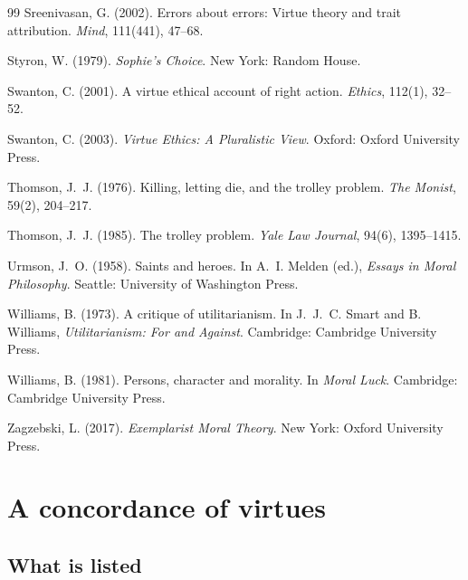 \documentclass{situationist-preprint}
\begin{document}
\begin{thebibliography}{99}
 Sreenivasan, G. (2002). Errors about errors: Virtue theory and trait attribution. \emph{Mind}, 111(441), 47--68.

 Styron, W. (1979). \emph{Sophie's Choice}. New York: Random House.

 Swanton, C. (2001). A virtue ethical account of right action. \emph{Ethics}, 112(1), 32--52.

 Swanton, C. (2003). \emph{Virtue Ethics: A Pluralistic View}. Oxford: Oxford University Press.

 Thomson, J.~J. (1976). Killing, letting die, and the trolley problem. \emph{The Monist}, 59(2), 204--217.

 Thomson, J.~J. (1985). The trolley problem. \emph{Yale Law Journal}, 94(6), 1395--1415.

 Urmson, J.~O. (1958). Saints and heroes. In A.~I. Melden (ed.), \emph{Essays in Moral Philosophy}. Seattle: University of Washington Press.

 Williams, B. (1973). A critique of utilitarianism. In J.~J.~C. Smart and B. Williams, \emph{Utilitarianism: For and Against}. Cambridge: Cambridge University Press.

 Williams, B. (1981). Persons, character and morality. In \emph{Moral Luck}. Cambridge: Cambridge University Press.

 Zagzebski, L. (2017). \emph{Exemplarist Moral Theory}. New York: Oxford University Press.

\end{thebibliography}

\clearpage
\appendix

\section{A concordance of virtues}\label{s:appA}

\subsection*{What is listed}
\end{document}
